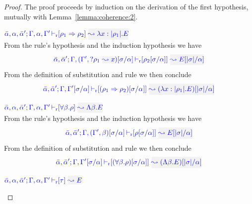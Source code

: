 \begin{proof}
The proof proceeds by induction on the derivation of the first hypothesis, mutually with Lemma~\ref{lemma:coherence:2}.
\begin{description}
\setlength{\itemsep}{1em}

\item[\fbox{\rref{R-IAbs}}]\quad$\drres{\bar{\alpha},\alpha,\bar{\alpha}'}{\tenv,\alpha,\tenv'}{\rulet_1 \To \rulet_2}{\abs{x}{|\rulet_1|}{E}}$ \\

From the rule's hypothesis and the induction hypothesis we have
\begin{equation*}
\drres{\bar{\alpha},\bar{\alpha}'}{\tenv,(\tenv',\envi{\rulet_1}{x})[\suty/\alpha]}{\rulet_2[\suty/\alpha]}{E[|\suty|/\alpha]}
\end{equation*}
From the definition of substitution and rule  we then conclude
\begin{equation*}
\drres{\bar{\alpha},\bar{\alpha}'}{\tenv,\tenv'[\suty/\alpha]}{(\rulet_1 \iarrow \rulet_2)[\suty/\alpha]}{(\abs{x}{\etrans{\rulet_1}}{E})[|\suty|/\alpha]}
\end{equation*}

\item[\fbox{\rref{R-TAbs}}]\quad$\drres{\bar{\alpha},\alpha,\bar{\alpha}'}{\tenv,\alpha,\tenv'}{\tall{\beta}{\rulet}}{\Abs{\beta}{E}}$\\

From the rule's hypothesis and the induction hypothesis we have
\begin{equation*}
\drres{\bar{\alpha},\bar{\alpha}'}{\tenv,(\tenv',\beta)[\suty/\alpha]}{\rulet[\suty/\alpha]}{E[|\suty|/\alpha]}
\end{equation*}
From the definition of substitution and rule  we then conclude
\begin{equation*}
\drres{\bar{\alpha},\bar{\alpha}'}{\tenv,\tenv'[\suty/\alpha]}{(\tall{\beta}{\rulet})[\suty/\alpha]}{(\Abs{\beta}{E})[|\suty|/\alpha]}
\end{equation*}
\item[\fbox{\rref{R-Simp}}]\quad$\drres{\bar{\alpha},\alpha,\bar{\alpha}'}{\tenv,\alpha,\tenv'}{\type}{E}$ \\


\end{description}
\end{proof}
